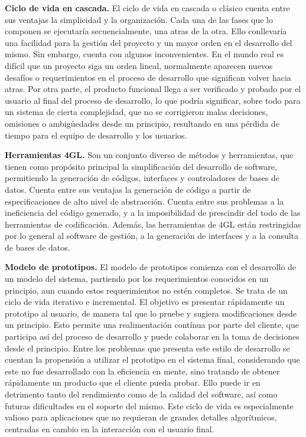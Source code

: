 \documentclass[12pt]{article}
\begin{document}
\textbf{Ciclo de vida en cascada.}
El ciclo de vida en cascada o clásico cuenta entre sus ventajas la simplicidad
y la organización. Cada una de las fases que lo componen se ejecutaría 
secuencialmente, una atras de la otra. Ello conllevaría una facilidad para la
gestión del proyecto y un mayor orden en el desarrollo del mismo.
Sin embargo, cuenta con algunos inconvenientes. En el mundo real es difícil que
un proyecto siga un orden lineal, normalmente aparecen nuevos desafíos o 
requerimientos en el proceso de desarrollo que significan volver hacia atras. 
Por otra parte, el producto funcional llega a ser verificado y probado por el 
usuario al final del proceso de desarrollo, lo que podría significar, sobre todo
para un sistema de cierta complejidad, que no se corrigieron malas decisiones,
omisiones o ambigüedades desde un principio, resultando en una pérdida de tiempo
para el equipo de desarrollo y los usuarios.

\textbf{Herramientas 4GL.}
Son un conjunto diverso de métodos y herramientas,
que tienen como propósito principal la simplificación del desarrollo de 
software,
permitiendo la generación de códigos,
interfaces y controladores de bases de datos.
Cuenta entre sus ventajas la generación de código a partir de 
especificaciones de alto nivel de abstracción.
Cuenta entre sus problemas a la ineficiencia del código generado,
y a la imposibilidad de prescindir del todo de las herramientas de codificación.
Además, las herramientas de 4GL están restringidas por lo general al software 
de gestión, a la generación de interfaces y a la consulta de bases de datos.

\textbf{Modelo de prototipos.}
El modelo de prototipos comienza con el desarrollo de un modelo del sistema,
partiendo por los requerimientos conocidos en un principio, aun cuando estos 
requerimientos no estén completos. Se trata de un ciclo de vida iterativo e 
incremental. El objetivo es presentar rápidamente un prototipo al usuario,
de manera tal que lo pruebe y sugiera modificaciones desde un principio.
Esto permite una realimentación contínua por parte del cliente, que participa
así del proceso de desarrollo y puede colaborar en la toma de decisiones desde 
el principio. Entre los problemas que presenta este estilo de desarrollo se 
cuentan la propensión a utilizar el prototipo en el sistema final, considerando
que este no fue desarrollado con la eficiencia en mente, sino tratando de 
obtener rápidamente un producto que el cliente pueda probar. Ello puede ir en 
detrimento tanto del rendimiento como de la calidad del software, así como futuras
dificultades en el soporte del mismo. Este ciclo de vida es especialmente 
valioso para aplicaciones que no requieran de grandes detalles algorítmicos,
centradas en cambio en la interacción con el usuario final.
\end{document}
